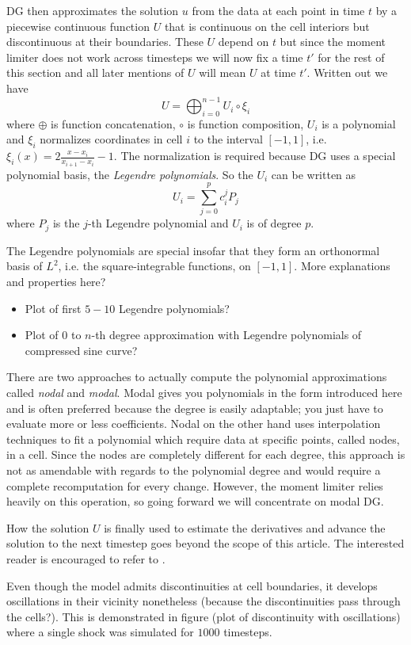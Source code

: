 DG then approximates the solution $u$ from the data at each point in time $t$ by a piecewise continuous function $U$ that is continuous on the cell interiors but discontinuous at their boundaries.
These $U$ depend on $t$ but since the moment limiter does not work across timesteps we will now fix a time $t'$ for the rest of this section and all later mentions of $U$ will mean $U$ at time $t'$.
Written out we have
\begin{equation*}
  U = \bigoplus_{i = 0}^{n - 1} U_{i} \circ \xi_{i}
\end{equation*}
where $\oplus$ is function concatenation, $\circ$ is function composition, $U_{i}$ is a polynomial and $\xi_{i}$ normalizes coordinates in cell $i$ to the interval $[-1, 1]$, i.e. $\xi_{i}(x) = 2 \frac{x - x_{i}}{x_{i + 1} - x_{i}} - 1$.
The normalization is required because DG uses a special polynomial basis, the \emph{Legendre polynomials}.
So the $U_{i}$ can be written as
\begin{equation*}
  U_{i} = \sum_{j = 0}^{p} c_{i}^{j} P_{j}
\end{equation*}
where $P_{j}$ is the $j$-th Legendre polynomial and $U_{i}$ is of degree $p$.

The Legendre polynomials are special insofar that they form an orthonormal basis of $L^{2}$, i.e. the square-integrable functions, on $[-1, 1]$.
More explanations and properties here?
\begin{itemize}
\item Plot of first $5-10$ Legendre polynomials?
\item Plot of $0$ to $n$-th degree approximation with Legendre polynomials of compressed sine curve?
\end{itemize}

There are two approaches to actually compute the polynomial approximations called \emph{nodal} and \emph{modal}.
Modal gives you polynomials in the form introduced here and is often preferred because the degree is easily adaptable; you just have to evaluate more or less coefficients.
Nodal on the other hand uses interpolation techniques to fit a polynomial which require data at specific points, called nodes, in a cell.
Since the nodes are completely different for each degree, this approach is not as amendable with regards to the polynomial degree and would require a complete recomputation for every change.
However, the moment limiter relies heavily on this operation, so going forward we will concentrate on modal DG.

How the solution $U$ is finally used to estimate the derivatives and advance the solution to the next timestep goes beyond the scope of this article.
The interested reader is encouraged to refer to \cite[chapter 3]{Hesthaven2007}.

Even though the model admits discontinuities at cell boundaries, it develops oscillations in their vicinity nonetheless (because the discontinuities pass through the cells?).
This is demonstrated in figure (plot of discontinuity with oscillations) where a single shock was simulated for $1000$ timesteps.
